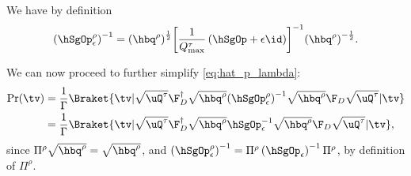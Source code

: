 We have by definition
\begin{equation}
  {\left(\hSgOp_\epsilon^{\rho}\right)}^{-1} = {\left(\hbq^{\rho}\right)}^{\frac{1}{2}}{\left[\frac{1}{Q_{\max}^{\tau}}\left({\hSgOp}+\epsilon\id\right)\right]}^{-1}{\left(\hbq^{\rho}\right)}^{-\frac{1}{2}}.
\end{equation}

We can now proceed to further simplify \cref{eq:hat_p_lambda}:
\begin{align}
  \label{eq:p_lambda_ast_simplified}
  \Pr(\tv)
  &=\frac{1}{\Gamma}{\Braket{\tv|\sqrt{\uQ^{\tau}}\F_{D}^\dag \sqrt{\hbq^{\rho}}{\left(\hSgOp_\epsilon^{\rho}\right)}^{-1} \sqrt{\hbq^{\rho}} \F_{D} \sqrt{\uQ^{\tau}}| \tv}}\nonumber\\
  &=\frac{1}{\Gamma}{\Braket{\tv|\sqrt{\uQ^{\tau}}\F_{D}^\dag \sqrt{\hbq^{\rho}}\hSgOp_\epsilon^{-1} \sqrt{\hbq^{\rho}} \F_{D} \sqrt{\uQ^{\tau}}| \tv}},
\end{align}
since $\Pi^\rho\sqrt{\hbq^{\rho}}=\sqrt{\hbq^{\rho}}$, and $\left(\hSgOp_\epsilon^{\rho}\right)^{-1}=\Pi^{\rho}\left(\hSgOp_\epsilon\right)^{-1}\Pi^{\rho}$, by definition of $\Pi^\rho$.


